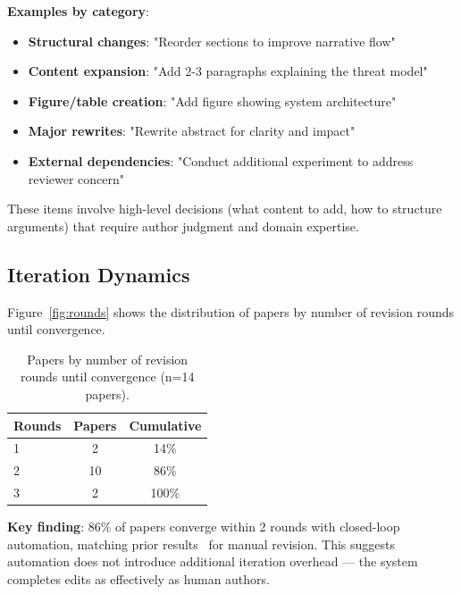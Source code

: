 \textbf{Examples by category}:
\begin{itemize}
\item \textbf{Structural changes}: "Reorder sections to improve narrative flow"
\item \textbf{Content expansion}: "Add 2-3 paragraphs explaining the threat model"
\item \textbf{Figure/table creation}: "Add figure showing system architecture"
\item \textbf{Major rewrites}: "Rewrite abstract for clarity and impact"
\item \textbf{External dependencies}: "Conduct additional experiment to address reviewer concern"
\end{itemize}

These items involve high-level decisions (what content to add, how to structure arguments) that require author judgment and domain expertise.

\subsection{Iteration Dynamics}

Figure~\ref{fig:rounds} shows the distribution of papers by number of revision rounds until convergence.

\begin{table}[t]
\centering
\caption{Papers by number of revision rounds until convergence (n=14 papers).}
\label{tab:rounds}
\begin{tabular}{lcc}
\toprule
Rounds & Papers & Cumulative \\
\midrule
1 & 2 & 14\% \\
2 & 10 & 86\% \\
3 & 2 & 100\% \\
\bottomrule
\end{tabular}
\end{table}

\textbf{Key finding}: 86\% of papers converge within 2 rounds with closed-loop automation, matching prior results~\cite{dellalibera2026dynamics} for manual revision. This suggests automation does not introduce additional iteration overhead — the system completes edits as effectively as human authors.